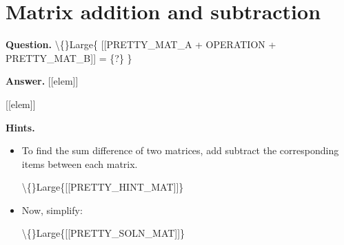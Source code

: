 \documentclass{article}
\begin{document}
\section*{Matrix addition and subtraction}
\textbf{Question.} \textbackslash\{\}Large\{
                [[PRETTY\_MAT\_A + OPERATION + PRETTY\_MAT\_B]] = \{?\}
            \}

\textbf{Answer.} [[elem]]
                
                
                    [[elem]]

\textbf{Hints.}
\begin{itemize}
  \item To find the
                sum
                difference
                of two matrices,
                add
                subtract
                the corresponding items between each matrix.
            
            
                \textbackslash\{\}Large\{[[PRETTY\_HINT\_MAT]]\}
  \item Now, simplify:
            
                \textbackslash\{\}Large\{[[PRETTY\_SOLN\_MAT]]\}
\end{itemize}
\end{document}
